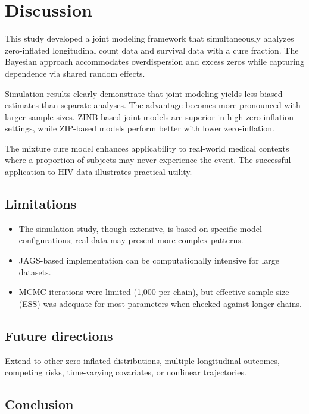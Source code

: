 \documentclass[twoside]{article}
\begin{document}
\section{Discussion}

This study developed a joint modeling framework that simultaneously analyzes zero-inflated longitudinal count data and survival data with a cure fraction. The Bayesian approach accommodates overdispersion and excess zeros while capturing dependence via shared random effects.

Simulation results clearly demonstrate that joint modeling yields less biased estimates than separate analyses. The advantage becomes more pronounced with larger sample sizes. ZINB-based joint models are superior in high zero-inflation settings, while ZIP-based models perform better with lower zero-inflation.

The mixture cure model enhances applicability to real-world medical contexts where a proportion of subjects may never experience the event. The successful application to HIV data illustrates practical utility.

\subsection*{Limitations}

\begin{itemize}
\item The simulation study, though extensive, is based on specific model configurations; real data may present more complex patterns.
\item JAGS-based implementation can be computationally intensive for large datasets.
\item MCMC iterations were limited (1,000 per chain), but effective sample size (ESS) was adequate for most parameters when checked against longer chains.
\end{itemize}

\subsection*{Future directions}

Extend to other zero-inflated distributions, multiple longitudinal outcomes, competing risks, time-varying covariates, or nonlinear trajectories.

\subsection*{Conclusion}
\end{document}
